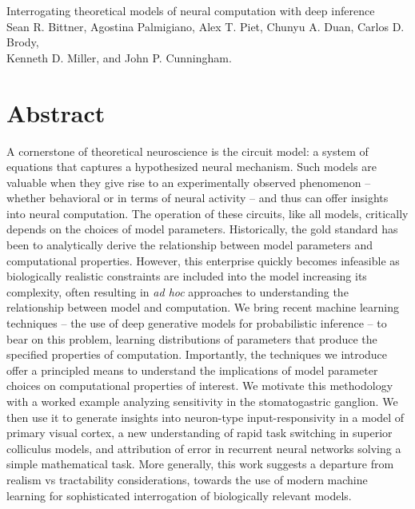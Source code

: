 \documentclass[11pt]{article}
\begin{document}
\medskip                        %

\thispagestyle{plain}
{\Large Interrogating theoretical models of neural computation with deep inference} \\
Sean R. Bittner, Agostina Palmigiano, Alex T. Piet, Chunyu A. Duan, Carlos D. Brody, \\
Kenneth D. Miller, and John P. Cunningham.

\linenumbers
\section{Abstract}
A cornerstone of theoretical neuroscience is the circuit model: a system of equations that captures a hypothesized neural mechanism.  
Such models are valuable when they give rise to an experimentally observed phenomenon -- whether behavioral or in terms of neural activity -- and thus can offer insights into neural computation.
The operation of these circuits, like all models, critically depends on the choices of model parameters.
Historically, the gold standard has been to analytically derive the relationship between model parameters and computational properties.  
However, this enterprise quickly becomes infeasible as biologically realistic constraints are included into the model increasing its complexity, often resulting in \emph{ad hoc} approaches to understanding the relationship between model and computation.  
We bring recent machine learning techniques -- the use of deep generative models for probabilistic inference -- to bear on this problem, learning distributions of parameters that produce the specified properties of computation.   
Importantly, the techniques we introduce offer a principled means to understand the implications of model parameter choices on computational properties of interest.  
We motivate this methodology with a worked example analyzing sensitivity in the stomatogastric ganglion.  
We then use it to generate insights into neuron-type input-responsivity in a model of primary visual cortex, a new understanding of rapid task switching in superior colliculus models, and attribution of error in recurrent neural networks solving a simple mathematical task. 
More generally, this work suggests a departure from realism vs tractability considerations, towards the use of modern machine learning for sophisticated interrogation of biologically relevant models.
\end{document}
